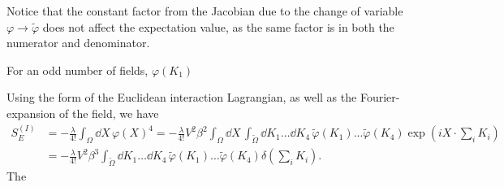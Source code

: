 Notice that the constant factor from the Jacobian due to the change of variable $\varphi \rightarrow \tilde \varphi$ does not affect the expectation value, as the same factor is in both the numerator and denominator.

For an odd number of fields, $\varphi(K_1)$

Using the form of the Euclidean interaction Lagrangian, as well as the Fourier-expansion of the field, we have
\begin{align*}
    S_E^{(I)} &= -\frac{\lambda}{4!} \int_{\Omega} \dd X\, \varphi(X)^4
    = -\frac{\lambda}{4!} V^2\beta^2 \int_{\Omega} \dd X\, \int_{\tilde \Omega} \dd K_1 \dots \dd K_4 \,  \tilde \varphi(K_1) ... \tilde \varphi(K_4) 
    \exp(iX \cdot {\sum}_i K_i) \\
    & = -\frac{\lambda}{4!} V^2\beta^3 \int_{\tilde \Omega} \dd K_1 \dots \dd K_4 \,
    \tilde \varphi(K_1) ... \tilde \varphi(K_4) \delta\left({\sum}_i K_i\right).
\end{align*}
The 
